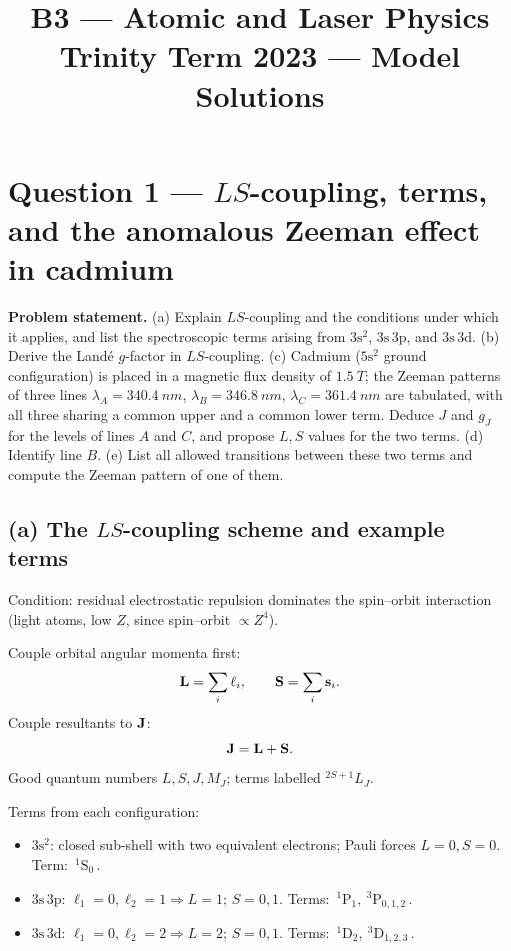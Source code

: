 \documentclass[11pt]{article}
\title{B3 --- Atomic and Laser Physics \\ Trinity Term 2023 --- Model Solutions}
\author{}
\date{}
\begin{document}
\maketitle

\section*{Question 1 --- $LS$-coupling, terms, and the anomalous Zeeman effect in cadmium}

\textbf{Problem statement.} (a) Explain $LS$-coupling and the conditions under which it applies, and list the spectroscopic terms arising from $3\mathrm{s}^{2}$, $3\mathrm{s}\,3\mathrm{p}$, and $3\mathrm{s}\,3\mathrm{d}$. (b) Derive the Land\'e $g$-factor in $LS$-coupling. (c) Cadmium ($5\mathrm{s}^{2}$ ground configuration) is placed in a magnetic flux density of $\SI{1.5}{T}$; the Zeeman patterns of three lines $\lambda_{A}=\SI{340.4}{nm}$, $\lambda_{B}=\SI{346.8}{nm}$, $\lambda_{C}=\SI{361.4}{nm}$ are tabulated, with all three sharing a common upper and a common lower term. Deduce $J$ and $g_{J}$ for the levels of lines $A$ and $C$, and propose $L,S$ values for the two terms. (d) Identify line $B$. (e) List all allowed transitions between these two terms and compute the Zeeman pattern of one of them.

\subsection*{(a) The $LS$-coupling scheme and example terms}

Condition: residual electrostatic repulsion dominates the spin--orbit interaction (light atoms, low $Z$, since spin--orbit $\propto Z^{4}$).

Couple orbital angular momenta first:
\begin{equation}
\vb L=\sum_i\vb\ell_i,\qquad \vb S=\sum_i\vb s_i.
\end{equation}
Couple resultants to $\vb J$:
\begin{equation}
\vb J=\vb L+\vb S.
\end{equation}
Good quantum numbers $L,S,J,M_{J}$; terms labelled $^{2S+1}L_{J}$.

Terms from each configuration:
\begin{itemize}
\item $3\mathrm{s}^{2}$: closed sub-shell with two equivalent electrons; Pauli forces $L=0,S=0$. Term: $\boxed{\,^{1}\mathrm{S}_{0}\,}$.
\item $3\mathrm{s}\,3\mathrm{p}$: $\ell_1=0,\ell_2=1\Rightarrow L=1$; $S=0,1$. Terms: $\boxed{\,^{1}\mathrm{P}_{1},\ ^{3}\mathrm{P}_{0,1,2}\,}$.
\item $3\mathrm{s}\,3\mathrm{d}$: $\ell_1=0,\ell_2=2\Rightarrow L=2$; $S=0,1$. Terms: $\boxed{\,^{1}\mathrm{D}_{2},\ ^{3}\mathrm{D}_{1,2,3}\,}$.
\end{itemize}
\end{document}
